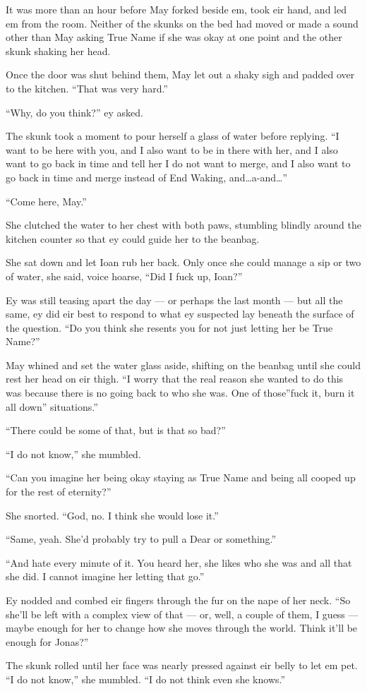 It was more than an hour before May forked beside em, took eir hand, and led em from the room. Neither of the skunks on the bed had moved or made a sound other than May asking True Name if she was okay at one point and the other skunk shaking her head.

Once the door was shut behind them, May let out a shaky sigh and padded over to the kitchen. ``That was very hard.''

``Why, do you think?'' ey asked.

The skunk took a moment to pour herself a glass of water before replying. ``I want to be here with you, and I also want to be in there with her, and I also want to go back in time and tell her I do not want to merge, and I also want to go back in time and merge instead of End Waking, and\ldots a-and\ldots{}''

``Come here, May.''

She clutched the water to her chest with both paws, stumbling blindly around the kitchen counter so that ey could guide her to the beanbag.

She sat down and let Ioan rub her back. Only once she could manage a sip or two of water, she said, voice hoarse, ``Did I fuck up, Ioan?''

Ey was still teasing apart the day — or perhaps the last month — but all the same, ey did eir best to respond to what ey suspected lay beneath the surface of the question. ``Do you think she resents you for not just letting her be True Name?''

May whined and set the water glass aside, shifting on the beanbag until she could rest her head on eir thigh. ``I worry that the real reason she wanted to do this was because there is no going back to who she was. One of those''fuck it, burn it all down'' situations.''

``There could be some of that, but is that so bad?''

``I do not know,'' she mumbled.

``Can you imagine her being okay staying as True Name and being all cooped up for the rest of eternity?''

She snorted. ``God, no. I think she would lose it.''

``Same, yeah. She'd probably try to pull a Dear or something.''

``And hate every minute of it. You heard her, she likes who she was and all that she did. I cannot imagine her letting that go.''

Ey nodded and combed eir fingers through the fur on the nape of her neck. ``So she'll be left with a complex view of that — or, well, a couple of them, I guess — maybe enough for her to change how she moves through the world. Think it'll be enough for Jonas?''

The skunk rolled until her face was nearly pressed against eir belly to let em pet. ``I do not know,'' she mumbled. ``I do not think even she knows.''
